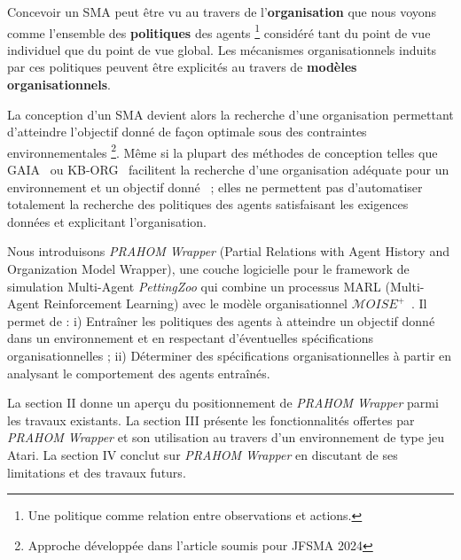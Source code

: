 \documentclass[demonstration]{jfsma}
\newcommand{\jp}[1]{\textbf{\color{red} JPJ: #1}}
\newcounter{relation}
\begin{document}

Concevoir un SMA peut être vu au travers de l'\textbf{organisation} que nous voyons comme l'ensemble des \textbf{politiques} des agents
\footnote{Une politique comme relation entre observations et actions.}
considéré tant du point de vue individuel que du point de vue global. Les mécanismes organisationnels induits par ces politiques peuvent être explicités au travers de \textbf{modèles organisationnels}.



La conception d'un SMA devient alors la recherche d'une organisation permettant d'atteindre l'objectif donné de façon optimale sous des contraintes environnementales
\footnote{Approche développée dans l'article  soumis pour JFSMA 2024 }.
Même si la plupart des méthodes de conception telles que GAIA~\cite{Cernuzzi2014} ou KB-ORG~\cite{Sims2008} facilitent la recherche d'une organisation adéquate pour un environnement et un objectif donné~\cite{Mefteh2013} ; elles ne permettent pas d'automatiser totalement la recherche des politiques des agents satisfaisant les exigences données et explicitant l'organisation.

Nous introduisons \emph{PRAHOM Wrapper} (Partial Relations with Agent History and Organization Model Wrapper), une couche logicielle pour le framework de simulation Multi-Agent \emph{PettingZoo} qui
combine un processus MARL (Multi-Agent Reinforcement Learning) avec le modèle organisationnel $\mathcal{M}OISE^+$~\cite{Hubner2007}.  Il permet de :
%
i) Entraîner les politiques des agents à atteindre un objectif donné dans un environnement et en respectant d'éventuelles spécifications organisationnelles ;\quad
ii) Déterminer des spécifications organisationnelles à partir en analysant le comportement des agents entraînés.

La section II donne un aperçu du positionnement de \emph{PRAHOM Wrapper} parmi les travaux existants.
La section III  présente les fonctionnalités offertes par \emph{PRAHOM Wrapper} et son utilisation au travers d'un environnement de type jeu Atari.
La section IV conclut sur \emph{PRAHOM Wrapper} en discutant de ses limitations et des travaux futurs.
\end{document}
